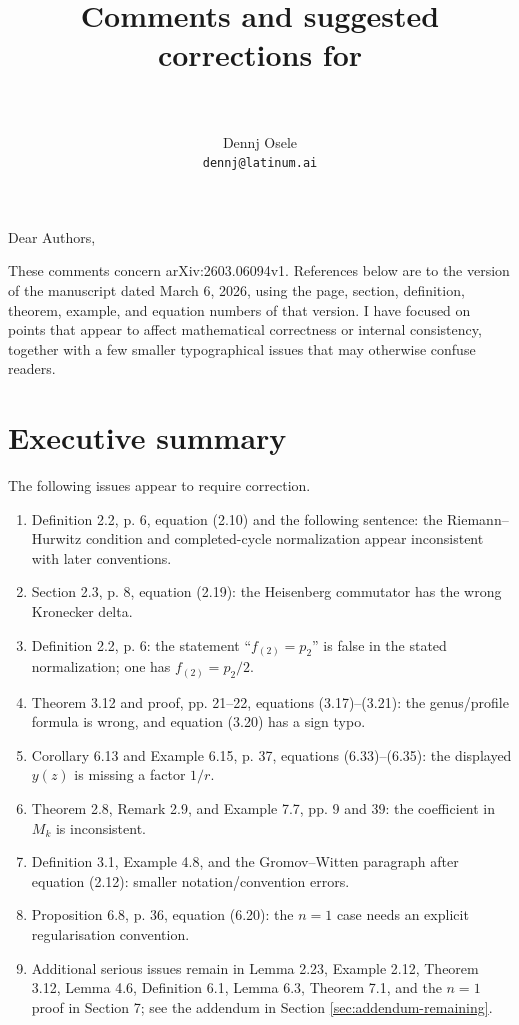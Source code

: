 \documentclass[11pt]{article}
\title{Comments and suggested corrections for\\
\paper\\
\large \arxiv}
\author{Dennj Osele\\\texttt{dennj@latinum.ai}}
\date{}
\newcommand{\arxiv}{arXiv:2603.06094v1}
\begin{document}
\maketitle

\noindent
Dear Authors,

\medskip
\noindent
These comments concern \arxiv.  References below are to the version of the manuscript dated March 6, 2026, using the page, section, definition, theorem, example, and equation numbers of that version.  I have focused on points that appear to affect mathematical correctness or internal consistency, together with a few smaller typographical issues that may otherwise confuse readers.

\section*{Executive summary}

The following issues appear to require correction.
\begin{enumerate}[label=\textbf{\arabic*.}]
   \item Definition 2.2, p. 6, equation (2.10) and the following sentence: the Riemann--Hurwitz condition and completed-cycle normalization appear inconsistent with later conventions.
   \item Section 2.3, p. 8, equation (2.19): the Heisenberg commutator has the wrong Kronecker delta.
   \item Definition 2.2, p. 6: the statement ``$f_{(2)}=p_2$'' is false in the stated normalization; one has $f_{(2)}=p_2/2$.
   \item Theorem 3.12 and proof, pp. 21--22, equations (3.17)--(3.21): the genus/profile formula is wrong, and equation (3.20) has a sign typo.
   \item Corollary 6.13 and Example 6.15, p. 37, equations (6.33)--(6.35): the displayed $y(z)$ is missing a factor $1/r$.
   \item Theorem 2.8, Remark 2.9, and Example 7.7, pp. 9 and 39: the coefficient in $M_k$ is inconsistent.
   \item Definition 3.1, Example 4.8, and the Gromov--Witten paragraph after equation (2.12): smaller notation/convention errors.
   \item Proposition 6.8, p. 36, equation (6.20): the $n=1$ case needs an explicit regularisation convention.
   \item Additional serious issues remain in Lemma 2.23, Example 2.12, Theorem 3.12, Lemma 4.6, Definition 6.1, Lemma 6.3, Theorem 7.1, and the $n=1$ proof in Section 7; see the addendum in Section \ref{sec:addendum-remaining}.
\end{enumerate}
\end{document}

